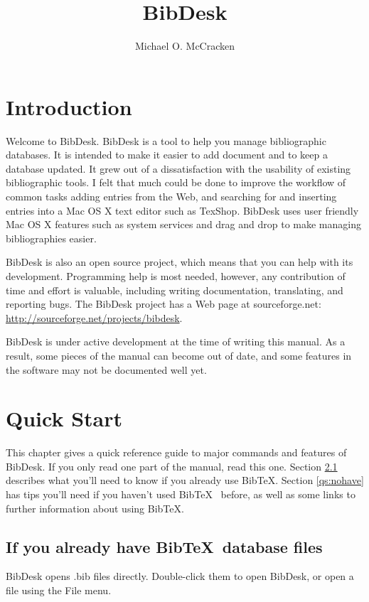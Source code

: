 \documentclass[11pt]{book}
\title{BibDesk}
\author{Michael O. McCracken}
\newif\ifpdf
\begin{document}
\ifpdf
\DeclareGraphicsExtensions{.pdf, .jpg, .tif}
\else
{}
\fi

\maketitle

\tableofcontents

\listoffigures

\chapter{Introduction}
Welcome to BibDesk. BibDesk is a tool to help you manage bibliographic databases.  It is intended to make it easier to add document and to keep a database updated.  It grew out of a dissatisfaction with the usability of existing bibliographic tools.  I felt that much could be done to improve the workflow of common tasks adding entries from the Web, and searching for and inserting entries into a Mac OS X text editor such as TexShop.  BibDesk uses user friendly Mac OS X features such as system services and drag and drop to make managing bibliographies easier. 

BibDesk is also an open source project, which means that you can help with its development.  Programming help is most needed, however, any contribution of time and effort is valuable, including writing documentation, translating, and reporting bugs.  The BibDesk project has a Web page at sourceforge.net: \url{http://sourceforge.net/projects/bibdesk}.

BibDesk is under active development at the time of writing this manual. As a result, some pieces of the manual can become out of date, and some features in the software may not be documented well yet. 

\chapter{Quick Start}
This chapter gives a quick reference guide to major commands and features of BibDesk. If you only read one part of the manual, read this one. Section \ref{qs:alreadyhave} describes what you'll need to know if you already use Bib\TeX. Section \ref{qs:nohave} has tips you'll need if you haven't used Bib\TeX~ before, as well as some links to further information about using Bib\TeX.

\section{If you already have Bib\TeX~database files}\label{qs:alreadyhave}
BibDesk opens .bib files directly. Double-click them to open BibDesk, or open a file using the File menu.
\end{document}
